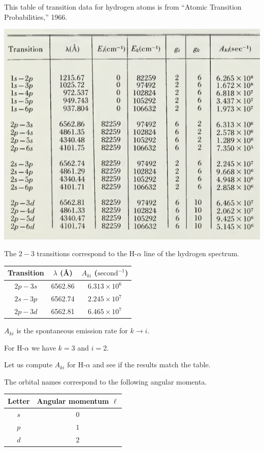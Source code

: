 \documentclass[12pt]{article}
\begin{document}
\noindent
This table of transition data for hydrogen atoms is from ``Atomic Transition Probabilities,'' 1966.

\begin{center}
\includegraphics[scale=0.5]{h-alpha-line.png}
\end{center}

\noindent
The $2-3$ transitions correspond to the H-$\alpha$ line of the hydrogen spectrum.
\begin{center}
\begin{tabular}{|c|c|c|}
\hline
Transition & $\lambda$ (\AA) & $A_{ki}$ ($\text{second}^{-1}$)
\\
\hline
$2p-3s$ & 6562.86 & $6.313\times10^6$
\\
$2s-3p$ & 6562.74 & $2.245\times10^7$
\\
$2p-3d$ & 6562.81 & $6.465\times10^7$
\\
\hline
\end{tabular}
\end{center}

\noindent
$A_{ki}$ is the spontaneous emission rate for $k\rightarrow i$.

\bigskip
\noindent
For H-$\alpha$ we have $k=3$ and $i=2$.

\bigskip
\noindent
Let us compute $A_{ki}$ for H-$\alpha$ and see if the results match the table.

\bigskip
\noindent
The orbital names correspond to the following angular momenta.
\begin{center}
\begin{tabular}{|c|c|}
\hline
Letter & Angular momentum $\ell$
\\
\hline
$s$ & $0$
\\
$p$ & $1$
\\
$d$ & $2$
\\
\hline
\end{tabular}
\end{center}
\end{document}
